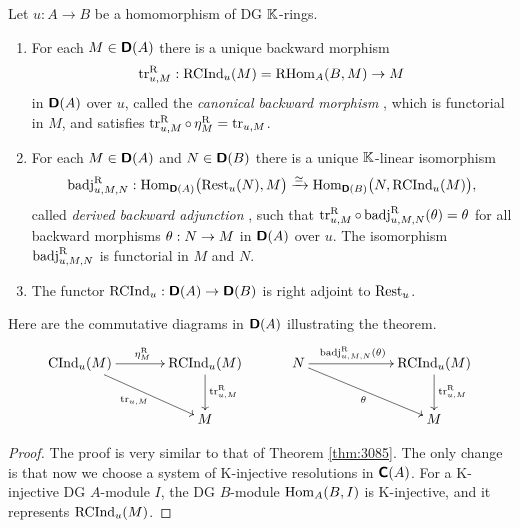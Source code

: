 \begin{thm} \label{thm:3192} 
Let $u : A \to B$ be a homomorphism of DG $\mathbb{K}$-rings.
\begin{enumerate}
\item For each $M \in \boldsymbol{\mathsf{D}}(A)$ there is a unique backward morphism 
\[ \operatorname{tr}_{u, M}^{\mathrm{R}} : \operatorname{RCInd}_u(M) = 
\operatorname{RHom}_{A}(B, M) \to  M \]
in $\boldsymbol{\mathsf{D}}(A)$ over $u$, called the {\em canonical backward morphism}%
%
,
which is functorial in $M$, and satisfies 
$\operatorname{tr}_{u, M}^{\mathrm{R}}  \circ \, \eta^{\mathrm{R}}_M  = \operatorname{tr}_{u, M}$.

\item For each $M \in \boldsymbol{\mathsf{D}}(A)$ and $N \in \boldsymbol{\mathsf{D}}(B)$
there is a unique $\mathbb{K}$-linear isomorphism 
\[ \operatorname{badj}_{u, M, N}^{\mathrm{R}} :  
\operatorname{Hom}_{\boldsymbol{\mathsf{D}}(A)} \bigl( \operatorname{Rest}_u(N), M \bigr) \xrightarrow{\simeq} 
\operatorname{Hom}_{\boldsymbol{\mathsf{D}}(B)} \bigl( N, \operatorname{RCInd}_u(M) \bigr) , \]
called {\em derived backward adjunction}%
%
,
such that 
$\operatorname{tr}_{u, M}^{\mathrm{R}} \circ \operatorname{badj}_{u, M, N}^{\mathrm{R}}(\theta) = \theta$
for all backward morphisms $\theta : N \to M$ in $\boldsymbol{\mathsf{D}}(A)$ over $u$.
The isomorphism $\operatorname{badj}_{u, M, N}^{\mathrm{R}}$ is functorial in $M$ and $N$. 

\item The functor
$\operatorname{RCInd}_u : \boldsymbol{\mathsf{D}}(A) \to \boldsymbol{\mathsf{D}}(B)$
is right adjoint to $\operatorname{Rest}_u$. 
\end{enumerate}
\end{thm}

Here are the commutative diagrams in $\boldsymbol{\mathsf{D}}(A)$ illustrating the theorem. 
\[ \UseTips \xymatrix @C=8ex @R=6ex {
\opn{CInd}_u(M)
\ar[r]^{\eta^{\mrm{R}}_M}
\ar[dr]_{\opn{tr}_{u, M}} 
&
\opn{RCInd}_u(M)
\ar[d]^{\opn{tr}_{u, M}^{\mrm{R}}}
\\
&
M
} 
\qquad \quad 
\UseTips \xymatrix @C=14ex @R=6ex {
N
\ar[r]^(0.4){\opn{badj}_{u, M, N}^{\mrm{R}}(\th)}
\ar[dr]_{\th} 
& 
\opn{RCInd}_u(M)
\ar[d]^{\opn{tr}_{u, M}^{\mrm{R}}}
\\
&
M
} 
\]

\begin{proof}
The proof is very similar to that of Theorem \ref{thm:3085}. The only change is 
that now we choose a system of K-injective resolutions in $\boldsymbol{\mathsf{C}}(A)$. 
For a K-injective DG $A$-module $I$, the DG $B$-module
$\operatorname{Hom}_A(B, I)$ is K-injective, and it represents
$\operatorname{RCInd}_u(M)$. 
\end{proof}


